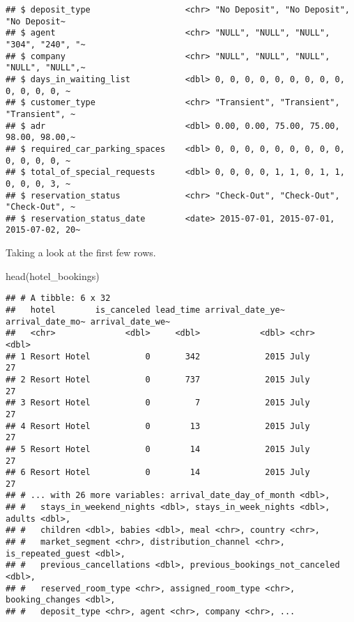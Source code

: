 \documentclass[
]{article}
\newenvironment{Shaded}{\begin{snugshade}}{\end{snugshade}}
\newcommand{\FunctionTok}[1]{\textcolor[rgb]{0.00,0.00,0.00}{#1}}
\newcommand{\NormalTok}[1]{#1}
\begin{document}
\begin{verbatim}
## $ deposit_type                   <chr> "No Deposit", "No Deposit", "No Deposit~
## $ agent                          <chr> "NULL", "NULL", "NULL", "304", "240", "~
## $ company                        <chr> "NULL", "NULL", "NULL", "NULL", "NULL",~
## $ days_in_waiting_list           <dbl> 0, 0, 0, 0, 0, 0, 0, 0, 0, 0, 0, 0, 0, ~
## $ customer_type                  <chr> "Transient", "Transient", "Transient", ~
## $ adr                            <dbl> 0.00, 0.00, 75.00, 75.00, 98.00, 98.00,~
## $ required_car_parking_spaces    <dbl> 0, 0, 0, 0, 0, 0, 0, 0, 0, 0, 0, 0, 0, ~
## $ total_of_special_requests      <dbl> 0, 0, 0, 0, 1, 1, 0, 1, 1, 0, 0, 0, 3, ~
## $ reservation_status             <chr> "Check-Out", "Check-Out", "Check-Out", ~
## $ reservation_status_date        <date> 2015-07-01, 2015-07-01, 2015-07-02, 20~
\end{verbatim}

Taking a look at the first few rows.

\begin{Shaded}
\begin{Highlighting}[]
\FunctionTok{head}\NormalTok{(hotel\_bookings)}
\end{Highlighting}
\end{Shaded}

\begin{verbatim}
## # A tibble: 6 x 32
##   hotel        is_canceled lead_time arrival_date_ye~ arrival_date_mo~ arrival_date_we~
##   <chr>              <dbl>     <dbl>            <dbl> <chr>                       <dbl>
## 1 Resort Hotel           0       342             2015 July                           27
## 2 Resort Hotel           0       737             2015 July                           27
## 3 Resort Hotel           0         7             2015 July                           27
## 4 Resort Hotel           0        13             2015 July                           27
## 5 Resort Hotel           0        14             2015 July                           27
## 6 Resort Hotel           0        14             2015 July                           27
## # ... with 26 more variables: arrival_date_day_of_month <dbl>,
## #   stays_in_weekend_nights <dbl>, stays_in_week_nights <dbl>, adults <dbl>,
## #   children <dbl>, babies <dbl>, meal <chr>, country <chr>,
## #   market_segment <chr>, distribution_channel <chr>, is_repeated_guest <dbl>,
## #   previous_cancellations <dbl>, previous_bookings_not_canceled <dbl>,
## #   reserved_room_type <chr>, assigned_room_type <chr>, booking_changes <dbl>,
## #   deposit_type <chr>, agent <chr>, company <chr>, ...
\end{verbatim}
\end{document}

